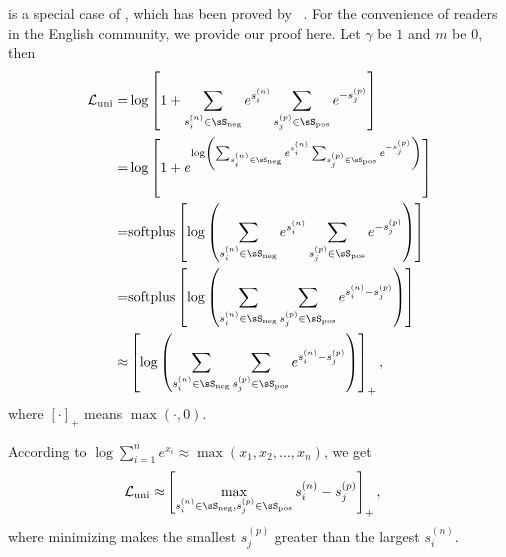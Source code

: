 \documentclass[paper_2425.tex]{subfiles}
\begin{document}
 is a special case of , which has been proved by ~\cite{su2020multilabelloss}. For the convenience of readers in the English community, we provide our proof here. Let $\gamma$ be $1$ and $m$ be $0$, then
\begin{align}
  \mathcal{L}_{\text {uni}}                                     = & \log \left[1+\sum_{s_{i}^{(n)} \in \sS_{\text{neg}}} e^ {s_{i}^{(n)}} \sum_{s_{j}^{(p)} \in \sS_{\text{pos}}} e^ {-s_{j}^{(p)}}\right]                       \label{apx:equ:unified_loss_r1_m0}                                                                                                                  \\
  =                                                               & \log \left[ 1 + e                                                                                                                      ^ { \log \left( \sum_{s_{i}^{(n)} \in \sS_{\text{neg}}} e^ {s_{i}^{(n)}} \sum_{s_{j}^{(p)} \in \sS_{\text{pos}}} e^ {-s_{j}^{(p)}} \right) } \right]   \nonumber          \\
  =                                                               & \text{softplus} \left[    {                                                                                                                 \log \left( \sum_{s_{i}^{(n)} \in \sS_{\text{neg}}} e^ {s_{i}^{(n)}} \sum_{s_{j}^{(p)} \in \sS_{\text{pos}}} e^ {-s_{j}^{(p)}} \right) } \right]           \nonumber \\
  =                                                               & \text{softplus} \left[    {                                                                                                                 \log \left( \sum_{s_{i}^{(n)} \in \sS_{\text{neg}}} \sum_{s_{j}^{(p)} \in \sS_{\text{pos}}} e^ {s_{i}^{(n)} - s_{j}^{(p)}} \right) } \right]               \nonumber \\
  \approx                                                         & \left[    {                                                                                                                 \log \left( \sum_{s_{i}^{(n)} \in \sS_{\text{neg}}} \sum_{s_{j}^{(p)} \in \sS_{\text{pos}}} e^ {s_{i}^{(n)} - s_{j}^{(p)}} \right) } \right]_{+}               \nonumber  ,
\end{align}
where $[\cdot]_+$ means $\max(\cdot, 0)$.

According to $\log \sum_{i=1}^{n} e^{x_i} \approx \max(x_1, x_2, \dots, x_n) $, we get
\begin{equation}
\begin{aligned}
    \mathcal{L}_{\text {uni}}                                     \approx & \left[    {                                                                                                                 \max_{s_{i}^{(n)} \in \sS_{\text{neg}}, s_{j}^{(p)} \in \sS_{\text{pos}}} {s_{i}^{(n)} - s_{j}^{(p)}}  } \right]_{+}      ,
  \end{aligned}
\label{apx:equ:unified_loss_approx}
\end{equation}
where minimizing  makes the smallest $s_{j}^{(p)}$ greater than the largest $s_{i}^{(n)}$.
\end{document}
